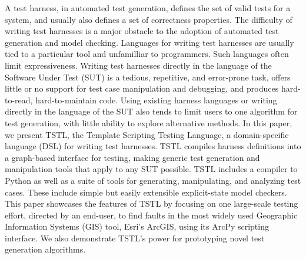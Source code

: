 A test harness, in automated test generation, defines the set of valid tests
for a system, and usually also defines a set of correctness
properties.  The difficulty of writing test harnesses is a major
obstacle to the adoption of automated test generation and model
checking.  Languages for writing test harnesses are usually tied to a
particular tool and unfamilliar to programmers.  Such languages often limit
expressiveness.  Writing test harnesses directly in the language of
the Software Under Test (SUT) is a tedious, repetitive, and
error-prone task, offers little or no support for test case
manipulation and debugging, and produces hard-to-read, hard-to-maintain
code.  Using existing harness languages or writing directly in the
language of the SUT also tends to limit users to one algorithm for
test generation, with little ability to explore alternative methods.
In this paper, we present TSTL, the Template Scripting Testing
Language, a domain-specific language (DSL) for writing test harnesses.
TSTL compiles harness definitions into a graph-based
interface for testing, making generic
test generation and manipulation tools that apply to any SUT possible.  TSTL includes a
compiler to Python as well as a suite of tools for generating, manipulating,
and analyzing test cases.  These include simple but easily extensible explicit-state model
checkers.  This paper showcases the features of TSTL by focusing on
one large-scale testing effort, directed by an end-user, to find
faults in the most widely used Geographic Information Systems (GIS) tool,
Esri's ArcGIS, using its ArcPy scripting interface.  We also
demonstrate TSTL's power for prototyping novel test generation algorithms.



